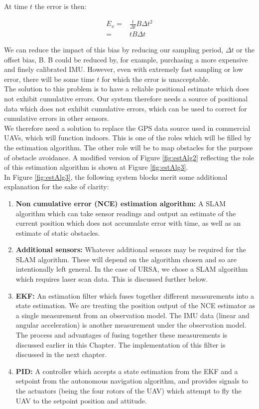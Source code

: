\documentclass[capstone_report.tex]{subfiles}
\begin{document}
At time $t$ the error is then:

\begin{align*} 
	E_x=&\frac{t}{\Delta t}B\Delta t^2\\
	=&tB\Delta t
\end{align*}

We can reduce the impact of this bias by reducing our sampling period, $\Delta t$ or the offset bias, B. B could be reduced by, for example, purchasing a more expensive and finely calibrated IMU. However, even with extremely fast sampling or low error, there will be some time $t$ for which the error is unacceptable.\\

The solution to this problem is to have a reliable positional estimate which does not exhibit cumulative errors. Our system therefore needs a source of positional data which does not exhibit cumulative errors, which can be used to correct for cumulative errors in other sensors. \\

We therefore need a solution to replace the GPS data source used in commercial UAVs, which will function indoors. This is one of the roles which will be filled by the estimation algorithm. The other role will be to map obstacles for the purpose of obstacle avoidance. A modified version of Figure \ref{fig:estAlg2} reflecting the role of this estimation algorithm is shown at Figure \ref{fig:estAlg3}.\\

In Figure \ref{fig:estAlg3}, the following system blocks merit some additional explanation for the sake of clarity:
\begin{enumerate}
	\item \textbf{Non cumulative error (NCE) estimation algorithm:} A SLAM algorithm which can take sensor readings and output an estimate of the current position which does not accumulate error with time, as well as an estimate of static obstacles.
	\item \textbf{Additional sensors:} Whatever additional sensors may be required for the SLAM algorithm. These will depend on the algorithm chosen and so are intentionally left general. In the case of URSA, we chose a SLAM algorithm which requires laser scan data. This is discussed further below.
	\item \textbf{EKF:} An estimation filter which fuses together different measurements into a state estimation. We are treating the position output of the NCE estimator as a single measurement from an observation model. The IMU data (linear and angular acceleration) is another measurement under the observation model. The process and advantages of fusing together these measurements is discussed earlier in this Chapter. The implementation of this filter is discussed in the next chapter.
	\item \textbf{PID:} A controller which accepts a state estimation from the EKF and a setpoint from the autonomous navigation algorithm, and provides signals to the actuators (being the four rotors of the UAV) which attempt to fly the UAV to the setpoint position and attitude.
\end{enumerate}
\end{document}
